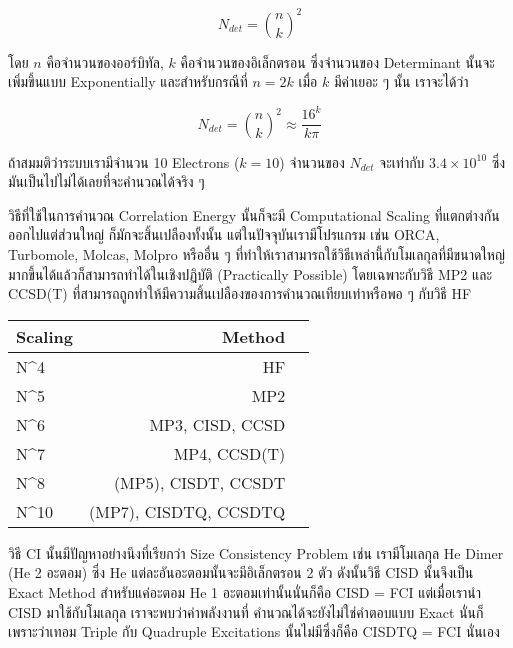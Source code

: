 \begin{equation}
    N_{det} = \binom{n}{k}^{2}
\end{equation}

\noindent โดย $n$ คือจำนวนของออร์บิทัล, $k$ คือจำนวนของอิเล็กตรอน ซึ่งจำนวนของ Determinant
นั้นจะเพิ่มขึ้นแบบ Exponentially และสำหรับกรณีที่ $n = 2k$ เมื่อ $k$ มีค่าเยอะ ๆ นั้น เราจะได้ว่า

\begin{equation}
    N_{det} = \binom{n}{k}^{2} \approx \frac{16^k}{k\pi}
\end{equation}

ถ้าสมมติว่าระบบเรามีจำนวน 10 Electrons ($k = 10$) จำนวนของ $N_{det}$ จะเท่ากับ $3.4 \times 10^{10}$
ซึ่งมันเป็นไปไม่ได้เลยที่จะคำนวณได้จริง ๆ

วิธีที่ใช้ในการคำนวณ Correlation Energy นั้นก็จะมี Computational Scaling ที่แตกต่างกันออกไปแต่ส่วนใหญ่%
ก็มักจะสิ้นเปลืองทั้งนั้น แต่ในปัจจุบันเรามีโปรแกรม เช่น ORCA, Turbomole, Molcas, Molpro หรืออื่น ๆ
ที่ทำให้เราสามารถใช้วิธีเหล่านี้กับโมเลกุลที่มีขนาดใหญ่มากขึ้นได้แล้วก็สามารถทำได้ในเชิงปฏิบัติ (Practically Possible)
โดยเฉพาะกับวิธี MP2 และ CCSD(T) ที่สามารถถูกทำให้มีความสิ้นเปลืองของการคำนวณเทียบเท่าหรือพอ ๆ กับวิธี HF

\begin{table}[!htp]
    \Large
    \centering
    \begin{tabular}{lrr}\toprule
        Scaling & Method                \\\midrule
        N^4     & HF                    \\
        N^5     & MP2                   \\
        N^6     & MP3, CISD, CCSD       \\
        N^7     & MP4, CCSD(T)          \\
        N^8     & (MP5), CISDT, CCSDT   \\
        N^{10}  & (MP7), CISDTQ, CCSDTQ \\
        \bottomrule
    \end{tabular}
\end{table}

วิธี CI นั้นมีปัญหาอย่างนึงที่เรียกว่า Size Consistency Problem เช่น เรามีโมเลกุล He Dimer (He 2 อะตอม)
ซึ่ง He แต่ละอันอะตอมนั้นจะมีอิเล็กตรอน 2 ตัว ดังนั้นวิธี CISD นั้นจึงเป็น Exact Method สำหรับแค่อะตอม He 1
อะตอมเท่านั้นนั่นก็คือ CISD = FCI แต่เมื่อเรานำ CISD มาใช้กับโมเลกุล  เราจะพบว่าค่าพลังงานที่%
คำนวณได้จะยังไม่ใช่คำตอบแบบ Exact นั่นก็เพราะว่าเทอม Triple กับ Quadruple Excitations นั้นไม่มีซึ่งก็คือ
CISDTQ = FCI นั่นเอง


